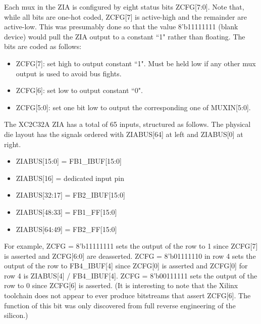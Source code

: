 \documentclass[pdftex,letterpaper]{article}
\begin{document}
Each mux in the ZIA is configured by eight status bits ZCFG[7:0]. Note that, while all bits are one-hot coded, 
ZCFG[7] is active-high and the remainder are active-low. This was presumably done so that the value 8'b11111111 
(blank device) would pull the ZIA output to a constant ``1" rather than floating. The bits are coded as follows:
\begin{itemize}
\item ZCFG[7]: set high to output constant ``1". Must be held low if any other mux output is used to avoid bus fights.
\item ZCFG[6]: set low to output constant ``0".
\item ZCFG[5:0]: set one bit low to output the corresponding one of MUXIN[5:0].
\end{itemize}

The XC2C32A ZIA has a total of 65 inputs, structured as follows. The physical die layout has the signals ordered with 
ZIABUS[64] at left and ZIABUS[0] at right.

\begin{itemize}
\item ZIABUS[15:0] = FB1\_IBUF[15:0]
\item ZIABUS[16] = dedicated input pin
\item ZIABUS[32:17] = FB2\_IBUF[15:0]
\item ZIABUS[48:33] = FB1\_FF[15:0]
\item ZIABUS[64:49] = FB2\_FF[15:0]
\end{itemize}

For example, ZCFG = 8'b11111111 sets the output of the row to 1 since ZCFG[7] is asserted and ZCFG[6:0] are 
deasserted. ZCFG = 8'b01111110 in row 4 sets the output of the row to FB4\_IBUF[4] since ZCFG[0] is asserted and 
ZCFG[0] for row 4 is ZIABUS[4] / FB4\_IBUF[4]. ZCFG = 8'b00111111 sets the output of the row to 0 since ZCFG[6] is 
asserted. (It is interesting to note that the Xilinx toolchain does not appear to ever produce bitstreams that assert 
ZCFG[6]. The function of this bit was only discovered from full reverse engineering of the silicon.)
\end{document}
